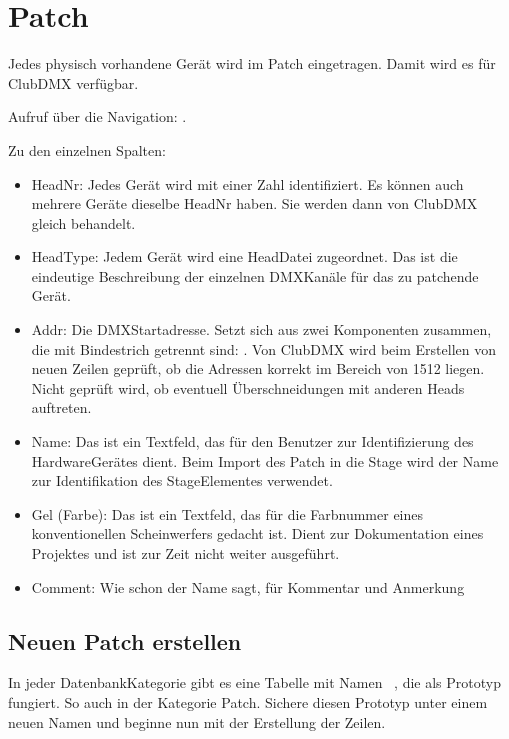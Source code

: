 \documentclass[letterpaper,10pt,ngerman]{sphinxmanual}
\begin{document}
\chapter{Patch}
\label{\detokenize{patch:patch}}\label{\detokenize{patch:patchlabel}}\label{\detokenize{patch::doc}}
Jedes physisch vorhandene Gerät wird im Patch eingetragen.
Damit wird es für ClubDMX verfügbar.

Aufruf über die Navigation: .

Zu den einzelnen Spalten:
\begin{itemize}
\item {} 
HeadNr: Jedes Gerät wird mit einer Zahl identifiziert.
Es können auch mehrere Geräte dieselbe HeadNr haben.
Sie werden dann von ClubDMX gleich behandelt.

\item {} 
HeadType: Jedem Gerät wird eine Head\sphinxhyphen{}Datei zugeordnet.
Das ist die eindeutige Beschreibung der einzelnen DMX\sphinxhyphen{}Kanäle
für das zu patchende Gerät.

\item {} 
Addr: Die DMX\sphinxhyphen{}Startadresse. Setzt sich aus zwei Komponenten zusammen,
die mit Bindestrich getrennt sind: .
Von ClubDMX wird beim Erstellen von neuen Zeilen geprüft,
ob die Adressen korrekt im Bereich von 1\sphinxhyphen{}512 liegen.
Nicht geprüft wird, ob eventuell Überschneidungen mit anderen Heads
auftreten.

\item {} 
Name: Das ist ein Textfeld, das für den Benutzer zur
Identifizierung des Hardware\sphinxhyphen{}Gerätes dient. Beim Import des Patch
in die Stage wird der Name zur Identifikation des Stage\sphinxhyphen{}Elementes
verwendet.

\item {} 
Gel (Farbe): Das ist ein Textfeld, das für die Farbnummer eines
konventionellen Scheinwerfers gedacht ist. Dient zur Dokumentation eines
Projektes und ist zur Zeit nicht weiter ausgeführt.

\item {} 
Comment: Wie schon der Name sagt, für Kommentar und Anmerkung

\end{itemize}


\section{Neuen Patch erstellen}
\label{\detokenize{patch:neuen-patch-erstellen}}\label{\detokenize{patch:neupatchlabel}}
In jeder Datenbank\sphinxhyphen{}Kategorie gibt es eine Tabelle mit Namen  ,
die als Prototyp fungiert. So auch in der Kategorie Patch.
Sichere diesen Prototyp unter einem neuen Namen und beginne
nun mit der Erstellung der Zeilen.
\end{document}
